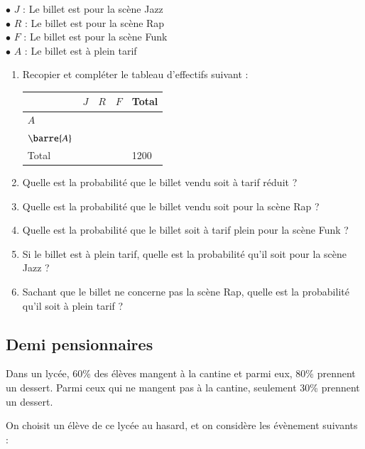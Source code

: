 \documentclass[oneside,12pt]{article}          %
\begin{document}
$\bullet$ $J$ : \og Le billet est pour la scène Jazz \fg \\
$\bullet$ $R$ : \og Le billet est pour la scène Rap \fg \\
$\bullet$ $F$ : \og Le billet est pour la scène Funk \fg \\
$\bullet$ $A$ : \og Le billet est à plein tarif \fg 

\begin{enumerate}
    \item Recopier et compléter le tableau d'effectifs suivant :
    \renewcommand{\arraystretch}{2}
        \begin{center}
            \begin{tabular}{| P{3cm} | P{3cm} | P{3cm} | P{3cm} | P{3cm} |}\hline
                 & $J$ & $R$ & $F$ & Total\\ \hline
                $A$ & & & & \\ \hline
                $\barre{A}$ & & & & \\ \hline
                Total & & & & 1200 \\ \hline
            \end{tabular}    
        \end{center}    
    \item Quelle est la probabilité que le billet vendu soit à tarif réduit ?
    \item Quelle est la probabilité que le billet vendu soit pour la scène Rap ?
    \item Quelle est la probabilité que le billet soit à tarif plein pour la scène Funk ?
    \item Si le billet est à plein tarif, quelle est la probabilité qu'il soit pour la scène Jazz ?
    \item Sachant que le billet ne concerne pas la scène Rap, quelle est la probabilité qu'il soit à plein tarif ?
\end{enumerate}



\subsection{Demi pensionnaires}
Dans un lycée, 60\% des élèves mangent à la cantine et parmi eux, 80\% prennent un dessert. Parmi ceux qui ne mangent pas à la cantine, seulement 30\% prennent un dessert.

On choisit un élève de ce lycée au hasard, et on considère les évènement suivants :
\end{document}
